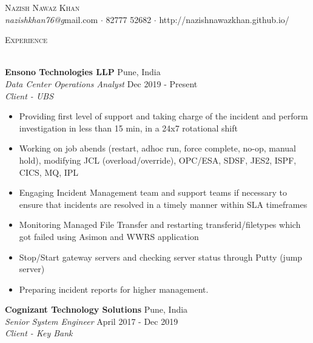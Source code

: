 \documentclass[a4paper]{article}
\newcommand{\lineunder} {
    \vspace*{-8pt} \\
    \hspace*{-18pt} \hrulefill \\
}
\newcommand{\header} [1] {
    {\hspace*{-18pt}\vspace*{6pt} \textsc{#1}}
    \vspace*{-6pt} \lineunder
}
\begin{document}
\vspace*{-40pt}

    

\vspace*{-10pt}
\begin{center}
	{\Huge \scshape {Nazish Nawaz Khan}}\\
	\vspace{2mm}
	{\emph{nazishkhan76@g}}mail.com $\cdot$ 82777 52682 $\cdot$ http://nazishnawazkhan.github.io/\\
\end{center}

{\color{blue}\header{Experience}}

\vspace{1mm}

\textbf{Ensono Technologies LLP} \hfill Pune, India\\
\textit{Data Center Operations Analyst} \hfill Dec 2019 - Present\\
\textit{Client - UBS} 
\vspace{-1mm}
\justify
\begin{itemize} \itemsep 1pt

	\item Providing first level of support and taking charge of the incident and perform investigation in less than 15 min, in a 24x7 rotational shift
	\item Working on job abends (restart, adhoc run, force complete, no-op, manual hold), modifying JCL (overload/override), OPC/ESA, SDSF, JES2, ISPF, CICS, MQ, IPL
	\item Engaging Incident Management team and support teams if necessary to ensure that incidents are resolved in a timely manner within SLA timeframes 
	\item Monitoring Managed File Transfer and restarting transferid/filetypes which got failed using Asimon and WWRS application
	\item Stop/Start gateway servers and checking server status through Putty (jump server)
           \item Preparing incident reports for higher management.
\end{itemize}
\vspace{2mm}
\textbf{Cognizant Technology Solutions} \hfill Pune, India\\
\textit{Senior System Engineer} \hfill April 2017 - Dec 2019\\
\textit{Client - Key Bank} 
\vspace{-1mm}
\end{document}

